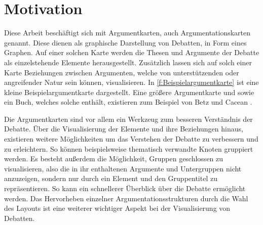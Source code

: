 \chapter{Motivation}
Diese Arbeit beschäftigt sich mit Argumentkarten, auch Argumentationskarten genannt.
Diese dienen als graphische Darstellung von Debatten, in Form eines Graphen.
Auf einer solchen Karte werden die Thesen und Argumente der Debatte als einzelstehende Elemente herausgestellt. 
Zusätzlich lassen sich auf solch einer Karte Beziehungen zwischen Argumenten, welche von unterstützenden oder angreifender Natur sein können, visualisieren.
In \autoref{f:Beispielargumentkarte} ist eine kleine Beispielargumentkarte dargestellt. 
Eine größere Argumentkarte und sowie ein Buch, welches solche enthält, existieren zum Beispiel von Betz und Cacean \cite{ClimateEngineering, betz2012ethical}.



Die Argumentkarten sind vor allem ein Werkzeug zum besseren Verständnis der Debatte. 
Über die Visualisierung der Elemente und ihre Beziehungen hinaus, existieren weitere Möglichkeiten um das Verstehen der Debatte zu verbessern und zu erleichtern.
So können beispielsweise thematisch verwandte Knoten gruppiert werden. 
Es besteht außerdem die Möglichkeit, Gruppen geschlossen zu visualisieren, also die in ihr enthaltenen Argumente und Untergruppen nicht anzuzeigen, sondern nur durch ein
Element und den Gruppentitel zu repräsentieren. So kann ein schnellerer  Überblick über die Debatte ermöglicht werden.
Das Hervorheben einzelner Argumentationsstrukturen durch die Wahl des Layouts ist eine weiterer wichtiger Aspekt bei der Visualisierung von Debatten.

